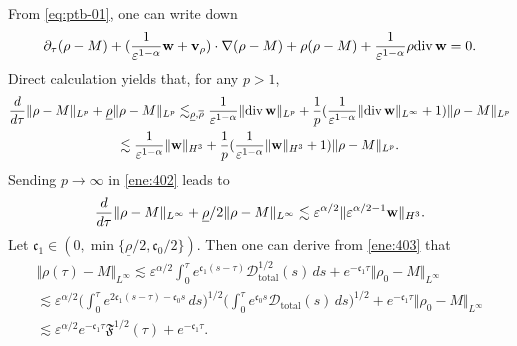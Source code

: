 \documentclass[11pt]{article}
\theoremstyle{plain}
\theoremstyle{definition}
\theoremstyle{remark}
\newcommand{\mrm}[1]{\mathrm{#1}}
\newcommand{\dtau}{\partial_\tau}
\newcommand{\dv}{\mathrm{div}\, }
\renewcommand{\vec}[1]{{\bf #1}}
\newcommand{\norm}[2]{\Vert #1 \Vert_{#2}}
\numberwithin{equation}{section}
\begin{document}
\smallskip 

From \eqref{eq:ptb-01}, one can write down
\begin{equation}
    \label{ene:401}
    \dtau (\rho - M) + (\frac{1}{\varepsilon^{1-\alpha}}\vec w + \vec v_\rho) \cdot \nabla (\rho - M) + \rho (\rho - M) + \frac{1}{\varepsilon^{1-\alpha}} \rho \dv \vec w  = 0.
\end{equation}
Direct calculation yields that, for any $ p > 1 $,
\begin{equation}
    \label{ene:402}
    \begin{gathered}
    \dfrac{d}{d\tau} \norm{\rho-M}{L^p} + \underline\rho \norm{\rho-M}{L^p} \lesssim_{\underline\rho, \overline\rho} \frac{1}{\varepsilon^{1-\alpha}} \norm{\dv \vec w}{L^p} + \frac{1}{p} (\frac{1}{\varepsilon^{1-\alpha}} \norm{\dv \vec w}{L^\infty} + 1) \norm{\rho-M}{L^p} \\
    \lesssim \frac{1}{\varepsilon^{1-\alpha}} \norm{\vec w}{H^3} + \frac{1}{p} (\frac{1}{\varepsilon^{1-\alpha}} \norm{\vec w}{H^3} + 1) \norm{\rho-M}{L^p}.
    \end{gathered}
\end{equation}
Sending $ p \rightarrow \infty $ in \eqref{ene:402} leads to 
\begin{equation}
    \label{ene:403}
    \dfrac{d}{d\tau} \norm{\rho-M}{L^\infty} + \underline\rho/2 \norm{\rho-M}{L^\infty} \lesssim \varepsilon^{\alpha/2} \norm{\varepsilon^{\alpha/2-1}\vec w}{H^3}.
\end{equation}
Let $ \mathfrak{c}_1 \in (0,\min\lbrace \underline\rho/2,\mathfrak c_0/2 \rbrace) $. Then one can derive from \eqref{ene:403} that
\begin{equation}
    \label{ene:404}
    \begin{gathered}
    \norm{\rho(\tau)-M}{L^\infty} \lesssim \varepsilon^{\alpha/2} \int_0^\tau e^{\mathfrak c_1 (s- \tau) } \mathcal D_\mrm{total}^{1/2}(s) \,ds + e^{-\mathfrak{c}_1 \tau} \norm{\rho_0 - M}{L^\infty}\\
    \lesssim \varepsilon^{\alpha/2} \biggl( \int_0^\tau e^{2\mathfrak{c}_1(s-\tau) - \mathfrak{c}_0 s}\,ds \biggr)^{1/2}\biggl( \int_0^\tau e^{\mathfrak c_0 s} \mathcal D_\mrm{total}(s)\,ds \biggr)^{1/2} + e^{-\mathfrak{c}_1 \tau} \norm{\rho_0 - M}{L^\infty} \\
    \lesssim \varepsilon^{\alpha/2} e^{-\mathfrak{c_1}\tau}\mathfrak F^{1/2}(\tau) + e^{-\mathfrak{c}_1 \tau}.
\end{gathered}
\end{equation}
\end{document}
